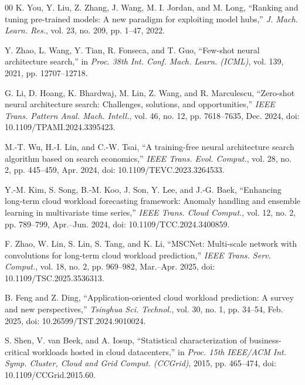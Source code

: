 \documentclass[a4paper,fleqn]{cas-sc}
\begin{document}
\begin{thebibliography}{00}
K. You, Y. Liu, Z. Zhang, J. Wang, M. I. Jordan, and M. Long,
``Ranking and tuning pre-trained models: A new paradigm for exploiting model hubs,''
\emph{J. Mach. Learn. Res.}, vol. 23, no. 209, pp. 1--47, 2022.

 Y. Zhao, L. Wang, Y. Tian, R. Fonseca, and T. Guo, ``Few-shot neural architecture search,'' in \emph{Proc. 38th Int. Conf. Mach. Learn. (ICML)}, vol. 139, 2021, pp. 12707--12718.

 G. Li, D. Hoang, K. Bhardwaj, M. Lin, Z. Wang, and R. Marculescu, ``Zero-shot neural architecture search: Challenges, solutions, and opportunities,'' \emph{IEEE Trans. Pattern Anal. Mach. Intell.}, vol. 46, no. 12, pp. 7618--7635, Dec. 2024, doi: 10.1109/TPAMI.2024.3395423.

 M.-T. Wu, H.-I. Lin, and C.-W. Tsai, ``A training-free neural architecture search algorithm based on search economics,'' \emph{IEEE Trans. Evol. Comput.}, vol. 28, no. 2, pp. 445--459, Apr. 2024, doi: 10.1109/TEVC.2023.3264533.

 Y.-M. Kim, S. Song, B.-M. Koo, J. Son, Y. Lee, and J.-G. Baek, ``Enhancing long-term cloud workload forecasting framework: Anomaly handling and ensemble learning in multivariate time series,'' \emph{IEEE Trans. Cloud Comput.}, vol. 12, no. 2, pp. 789--799, Apr.--Jun. 2024, doi: 10.1109/TCC.2024.3400859.

 F. Zhao, W. Lin, S. Lin, S. Tang, and K. Li, ``MSCNet: Multi-scale network with convolutions for long-term cloud workload prediction,'' \emph{IEEE Trans. Serv. Comput.}, vol. 18, no. 2, pp. 969--982, Mar.--Apr. 2025, doi: 10.1109/TSC.2025.3536313.

 B. Feng and Z. Ding, ``Application-oriented cloud workload prediction: A survey and new perspectives,'' \emph{Tsinghua Sci. Technol.}, vol. 30, no. 1, pp. 34--54, Feb. 2025, doi: 10.26599/TST.2024.9010024.

S. Shen, V. van Beek, and A. Iosup,
``Statistical characterization of business-critical workloads hosted in cloud datacenters,''
in \emph{Proc. 15th IEEE/ACM Int. Symp. Cluster, Cloud and Grid Comput. (CCGrid)},
2015, pp. 465--474, doi: 10.1109/CCGrid.2015.60.

\end{thebibliography}
\end{document}
